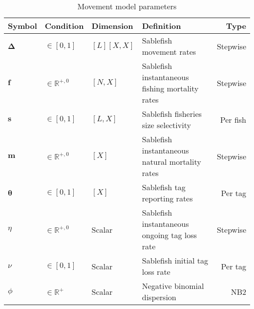\documentclass{article}
\begin{document}
\begin{table}[ht]
  \centering
  \caption{Movement model parameters}
  \renewcommand\arraystretch{1.2}
  \label{tab:model-parameters-0}
  \begin{tabular}{l l l l r}
    \toprule
    \textbf{Symbol} & \textbf{Condition} & \textbf{Dimension} & \textbf{Definition} & \textbf{Type} \\
    \toprule
    $\boldsymbol{\Delta}$ & $\in \left[0, 1 \right]$ & $[L][X, X]$ & Sablefish movement rates & Stepwise \\
    $\bm{f}$ & $\in \mathbb{R}^{+,0}$ & $[N, X]$ & Sablefish instantaneous fishing mortality rates & Stepwise \\
    $\bm{s}$ & $\in \left[0, 1 \right]$ & $[L, X]$ & Sablefish fisheries size selectivity & Per fish \\
    $\bm{m}$ & $\in \mathbb{R}^{+,0}$ & $[X]$ & Sablefish instantaneous natural mortality rates & Stepwise \\
    $\boldsymbol{\theta}$ & $\in \left[0, 1 \right]$ & $[X]$ & Sablefish tag reporting rates & Per tag \\
    $\eta$ & $\in \mathbb{R}^{+,0}$ & Scalar & Sablefish instantaneous ongoing tag loss rate & Stepwise \\
    $\nu$ & $\in \left[0, 1 \right]$ & Scalar & Sablefish initial tag loss rate & Per tag \\    
    $\phi$ & $\in \mathbb{R}^{+}$ & Scalar & Negative binomial dispersion & NB2 \\
    \bottomrule
  \end{tabular}
\end{table}




\end{document}
